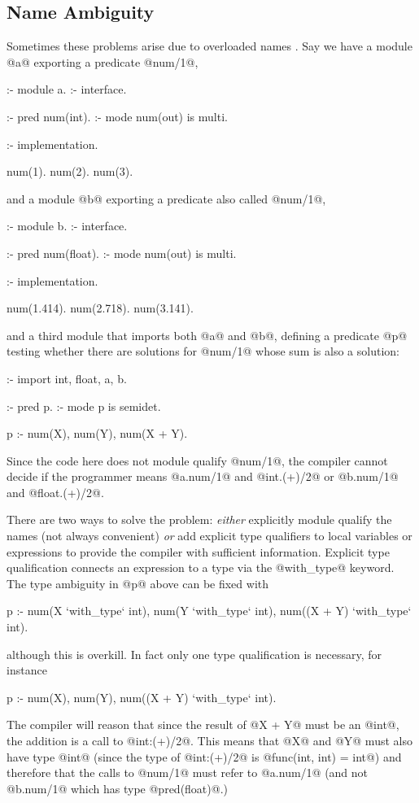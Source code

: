 \subsection{Name Ambiguity}

Sometimes these problems arise due to overloaded names .  Say we have a module
@a@ exporting a predicate @num/1@,
\begin{myverbatim}
:- module a.
:- interface.

:- pred num(int).
:- mode num(out) is multi.

:- implementation.

num(1).
num(2).
num(3).
\end{myverbatim}
and a module @b@ exporting a predicate also called @num/1@,
\begin{myverbatim}
:- module b.
:- interface.

:- pred num(float).
:- mode num(out) is multi.

:- implementation.

num(1.414).
num(2.718).
num(3.141).
\end{myverbatim}
and a third module that imports both @a@ and @b@, defining a predicate @p@
testing whether there are solutions for @num/1@ whose sum is also a
solution:
\begin{myverbatim}
:- import int, float, a, b.

:- pred p.
:- mode p is semidet.

p :-
    num(X),
    num(Y),
    num(X + Y).
\end{myverbatim}
Since the code here does not module qualify @num/1@, the compiler cannot
decide if the programmer means @a.num/1@ and @int.(+)/2@ or @b.num/1@ and
@float.(+)/2@.

There are two ways to solve the problem: \emph{either} explicitly
module qualify the names (not always convenient) \emph{or} add
explicit type qualifiers to local variables or expressions to provide
the compiler with sufficient information.  Explicit
type qualification connects an expression to a type via the @with_type@
keyword.  The type ambiguity in @p@ above can be fixed with
\begin{myverbatim}
p :-
    num(X `with_type` int),
    num(Y `with_type` int),
    num((X + Y) `with_type` int).
\end{myverbatim}
although this is overkill.  In fact only one type qualification is
necessary, for instance
\begin{myverbatim}
p :-
    num(X),
    num(Y),
    num((X + Y) `with_type` int).
\end{myverbatim}
The compiler will reason that since the result of @X + Y@ must be an
@int@, the addition is a call to @int:(+)/2@.  This means that @X@ and @Y@
must also have type @int@ (since the type of @int:(+)/2@ is
@func(int, int) = int@) and therefore that the calls to @num/1@ must refer
to @a.num/1@ (and not @b.num/1@ which has type @pred(float)@.)

